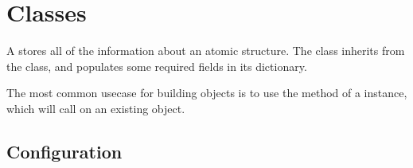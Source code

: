 \documentclass[letterpaper,10pt,english]{sphinxmanual}
\begin{document}
\chapter{Classes}
\label{\detokenize{classes:classes}}\label{\detokenize{classes:colabfit-tools}}\label{\detokenize{classes::doc}}\label{\detokenize{configuration:module-colabfit.tools.configuration}}
\sphinxAtStartPar
A {\hyperref[\detokenize{configuration:colabfit.tools.configuration.Configuration}]{}} stores all of the information about an atomic
structure. The {\hyperref[\detokenize{configuration:colabfit.tools.configuration.Configuration}]{}} class inherits from the 
class, and populates some required fields in its  dictionary.

\sphinxAtStartPar
The most common use\sphinxhyphen{}case for building {\hyperref[\detokenize{configuration:colabfit.tools.configuration.Configuration}]{}} objects is to use
the {\hyperref[\detokenize{converters:colabfit.tools.converters.BaseConverter.load}]{}} method of a
 instance, which will call
{\hyperref[\detokenize{configuration:colabfit.tools.configuration.Configuration.from_ase}]{}} on an existing  object.

\begin{sphinxVerbatim}[commandchars=\\\{\}]
   

  

  
\end{sphinxVerbatim}


\section{Configuration}
\label{\detokenize{configuration:configuration}}\label{\detokenize{configuration::doc}}
\end{document}
